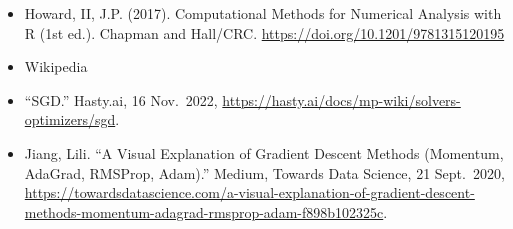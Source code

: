 \documentclass[
]{article}
\providecommand{\tightlist}{%
  \setlength{\itemsep}{0pt}\setlength{\parskip}{0pt}}
\begin{document}
\begin{itemize}
\tightlist
\item
  Howard, II, J.P. (2017). Computational Methods for Numerical Analysis
  with R (1st ed.). Chapman and Hall/CRC.
  \url{https://doi.org/10.1201/9781315120195}
\item
  Wikipedia
\item
  ``SGD.'' Hasty.ai, 16 Nov.~2022,
  \url{https://hasty.ai/docs/mp-wiki/solvers-optimizers/sgd}.
\item
  Jiang, Lili. ``A Visual Explanation of Gradient Descent Methods
  (Momentum, AdaGrad, RMSProp, Adam).'' Medium, Towards Data Science, 21
  Sept.~2020,
  \url{https://towardsdatascience.com/a-visual-explanation-of-gradient-descent-methods-momentum-adagrad-rmsprop-adam-f898b102325c}.
\end{itemize}
\end{document}
